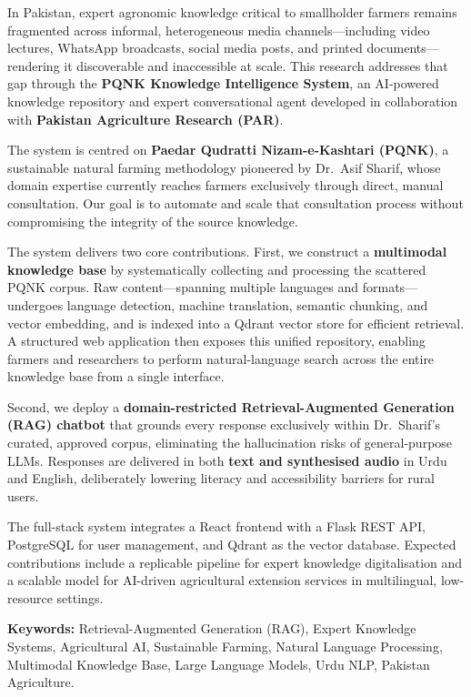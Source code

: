 \documentclass[12pt, a4paper]{article}
\begin{document}
\begin{onehalfspace}

In Pakistan, expert agronomic knowledge critical to smallholder farmers remains
fragmented across informal, heterogeneous media channels—including video lectures,
WhatsApp broadcasts, social media posts, and printed documents—rendering it
discoverable and inaccessible at scale. This research addresses that gap through the
\textbf{PQNK Knowledge Intelligence System}, an AI-powered knowledge repository
and expert conversational agent developed in collaboration with
\textbf{Pakistan Agriculture Research (PAR)}.

The system is centred on \textbf{Paedar Qudratti Nizam-e-Kashtari (PQNK)}, a
sustainable natural farming methodology pioneered by Dr.~Asif Sharif, whose domain
expertise currently reaches farmers exclusively through direct, manual consultation.
Our goal is to automate and scale that consultation process without compromising
the integrity of the source knowledge.

The system delivers two core contributions. First, we construct a
\textbf{multimodal knowledge base} by systematically collecting and processing the
scattered PQNK corpus. Raw content—spanning multiple languages and formats—undergoes
language detection, machine translation, semantic chunking, and vector embedding,
and is indexed into a Qdrant vector store for efficient retrieval. A structured web
application then exposes this unified repository, enabling farmers and researchers
to perform natural-language search across the entire knowledge base from a
single interface.

Second, we deploy a \textbf{domain-restricted Retrieval-Augmented Generation (RAG)
chatbot} that grounds every response exclusively within Dr.~Sharif's curated,
approved corpus, eliminating the hallucination risks of general-purpose LLMs.
Responses are delivered in both \textbf{text and synthesised audio} in Urdu and
English, deliberately lowering literacy and accessibility barriers for rural users.

The full-stack system integrates a React frontend with a Flask REST API, PostgreSQL
for user management, and Qdrant as the vector database. Expected contributions
include a replicable pipeline for expert knowledge digitalisation and a scalable
model for AI-driven agricultural extension services in multilingual, low-resource
settings.

\end{onehalfspace}

\vspace{12pt}

\noindent\textbf{Keywords:} Retrieval-Augmented Generation (RAG), Expert Knowledge Systems, Agricultural AI, Sustainable Farming, Natural Language Processing, Multimodal Knowledge Base, Large Language Models, Urdu NLP, Pakistan Agriculture.

\vspace{16pt}
\end{document}
